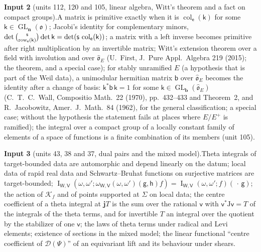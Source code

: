 \documentclass[11pt,a4paper]{article}
\theoremstyle{plainx}
\theoremstyle{uprightx}
\newcommand{\dS}{\Psi}                 %
\newcommand{\sO}{\mathfrak{o}}
\newcommand{\bb}{\mathbf{b}}
\newcommand{\bn}{\mathbf{n}}
\newcommand{\sW}{\mathsf{W}}
\newcommand{\sV}{\mathsf{V}}
\newcommand{\se}{\mathsf{e}}
\newcommand{\sg}{\mathsf{g}}
\newcommand{\sh}{\mathsf{h}}
\newcommand{\sk}{\mathsf{k}}
\newcommand{\ssx}{\mathsf{s}}
\newcommand{\GL}{\operatorname{GL}}
\newcommand{\cD}{\mathcal{D}}
\newcommand{\rowk}[2]{\operatorname{row}_{#1}(#2)}
\newcommand{\colk}[2]{\operatorname{col}_{#1}(#2)}
\newcommand{\thI}[5]{\operatorname{I}_{#1,#2}(#3,#4;#5)}
\begin{document}
{\vspace{3pt}\label{i:la}\textbf{Input 2} (units 112, 120 and 105, linear algebra, Witt's
theorem and a fact on compact groups).\enspace A matrix is primitive exactly when it is $\colk{\se}{\sk}$ for some $\sk\in\GL_{\bn}(\sO)$;
Jacobi's identity for complementary minors,
$\det\tbinom{\ssx}{\rowk{\se}{\sk}}\det\sk=\det(\ssx\,\colk{\se}{\sk})$; a matrix with a left inverse becomes
primitive after right multiplication by an invertible matrix; Witt's extension theorem over a field with
involution and over $\hat{\mathfrak{o}}_E$ (U.~First, J.~Pure Appl.\ Algebra 219 (2015); the theorem, and a special
case); for stably unramified $E$ (a hypothesis that is part of the Weil data), a unimodular hermitian matrix
$\mathsf{b}$ over $\hat{\mathfrak{o}}_E$ becomes the identity after a change of basis:
$\sk^{*}\mathsf{b}\,\sk=1$ for some $\sk\in\GL_{\bb}(\hat{\mathfrak{o}}_E)$ (C.~T.~C.~Wall, Compositio Math.\ 22
(1970), pp.~432--433 and Theorem~2, and R.~Jacobowitz, Amer.\ J.~Math.\ 84 (1962), for the general
classification; a special case; without the hypothesis the statement fails at places where $E/E^{+}$ is ramified); the
integral over a compact group of a locally constant family of elements of a space of functions is a finite
combination of its members (unit 105).

\vspace{3pt}\label{i:dual}\textbf{Input 3} (units 43, 38 and 37, dual pairs and the mixed
model).\enspace Theta integrals of target-bounded data are automorphic and depend linearly on the datum; local
data of rapid real data and Schwartz--Bruhat functions on surjective matrices are target-bounded;
$\thI{\sW}{\sV}{\omega}{\omega'}{\omega_{\sW,\sV}(\omega,\omega')(\sg,\sh)f}=\thI{\sW}{\sV}{\omega}{\omega'}{f}(\,\cdot\,\sg)$;
the action of $\mathcal{K}_f$ and of points supported at $\Sigma$ on local data; the centre coefficient of a theta integral
at $\mathbf{j} T$ is the sum over the rational $\mathsf{v}$ with $\mathsf{v}^{*}\mathrm{J}\mathsf{v}=T$ of the integrals of the theta terms, and for
invertible $T$ an integral over the quotient by the stabilizer of one $\mathsf{v}$; the laws of theta terms under
radical and Levi elements; existence of sections in the mixed model; the linear functional ``centre coefficient of
$\cD(\dS)$'' of an equivariant lift and its behaviour under shears.}
\end{document}
